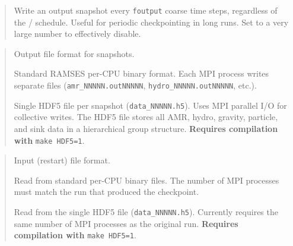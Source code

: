 \label{param:foutput}

\begin{quote}
Write an output snapshot every \texttt{foutput} coarse time steps,
regardless of the / schedule.  Useful
for periodic checkpointing in long runs.  Set to a very large number
to effectively disable.
\end{quote}

\label{param:outformat}

\begin{quote}
Output file format for snapshots.
\begin{description}[style=nextline,leftmargin=2.5cm,font=\ttfamily]
  \item[`original'] Standard RAMSES per-CPU binary format.  Each MPI
    process writes separate files (\texttt{amr\_NNNNN.outNNNNN},
    \texttt{hydro\_NNNNN.outNNNNN}, etc.).
  \item[`hdf5'] Single HDF5 file per snapshot (\texttt{data\_NNNNN.h5}).
    Uses MPI parallel I/O for collective writes.  The HDF5 file stores
    all AMR, hydro, gravity, particle, and sink data in a hierarchical
    group structure.  \textbf{Requires compilation with}
    \texttt{make~HDF5=1}.
\end{description}

\end{quote}

\label{param:informat}

\begin{quote}
Input (restart) file format.
\begin{description}[style=nextline,leftmargin=2.5cm,font=\ttfamily]
  \item[`original'] Read from standard per-CPU binary files.  The
    number of MPI processes must match the run that produced the
    checkpoint.
  \item[`hdf5'] Read from the single HDF5 file
    (\texttt{data\_NNNNN.h5}).  Currently requires the same number of
    MPI processes as the original run.  \textbf{Requires compilation
    with} \texttt{make~HDF5=1}.
\end{description}

\end{quote}


